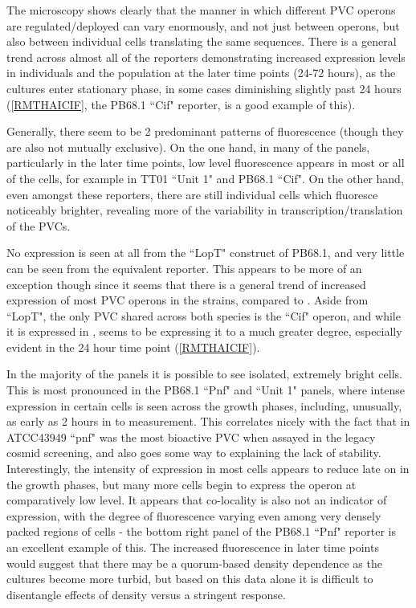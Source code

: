
\clearpage

The microscopy shows clearly that the manner in which different PVC operons are regulated/deployed can vary enormously, and not just between operons, but also between individual cells translating the same sequences. There is a general trend across almost all of the reporters demonstrating increased expression levels in individuals and the population at the later time points (24-72 hours), as the cultures enter stationary phase, in some cases diminishing slightly past 24 hours (\vref{RMTHAICIF}, the PB68.1 ``Cif" reporter, is a good example of this).

Generally, there seem to be 2 predominant patterns of fluorescence (though they are also not mutually exclusive). On the one hand, in many of the panels, particularly in the later time points, low level fluorescence appears in most or all of the cells, for example in \Plum{} TT01 ``Unit 1" and \Pasy{} PB68.1 ``Cif". On the other hand, even amongst these reporters, there are still individual cells which fluoresce noticeably brighter, revealing more of the variability in transcription/translation of the PVCs.

No expression is seen at all from the ``LopT" construct of PB68.1, and very little can be seen from the equivalent \Plum{} reporter. This appears to be more of an exception though since it seems that there is a general trend of increased expression of most PVC operons in the \Pasy{} strains, compared to \Plum. Aside from ``LopT", the only PVC shared across both species is the ``Cif" operon, and while it is expressed in \Plum, \Pasy{} seems to be expressing it to a much greater degree, especially evident in the 24 hour time point (\vref{RMTHAICIF}).

In the majority of the panels it is possible to see isolated, extremely bright cells. This is most pronounced in the \Pasy{} PB68.1 ``Pnf" and ``Unit 1" panels, where intense expression in certain cells is seen across the growth phases, including, unusually, as early as 2 hours in to measurement. This correlates nicely with the fact that in \Pasy{} ATCC43949 ``pnf" was the most bioactive PVC when assayed in the legacy cosmid screening, and also goes some way to explaining the lack of stability. Interestingly, the intensity of expression in most cells appears to reduce late on in the growth phases, but many more cells begin to express the operon at comparatively low level. It appears that co-locality is also not an indicator of expression, with the degree of fluorescence varying even among very densely packed regions of cells - the bottom right panel of the PB68.1 ``Pnf" reporter is an excellent example of this. The increased fluorescence in later time points would suggest that there may be a quorum-based density dependence as the cultures become more turbid, but based on this data alone it is difficult to disentangle effects of density versus a stringent response.

